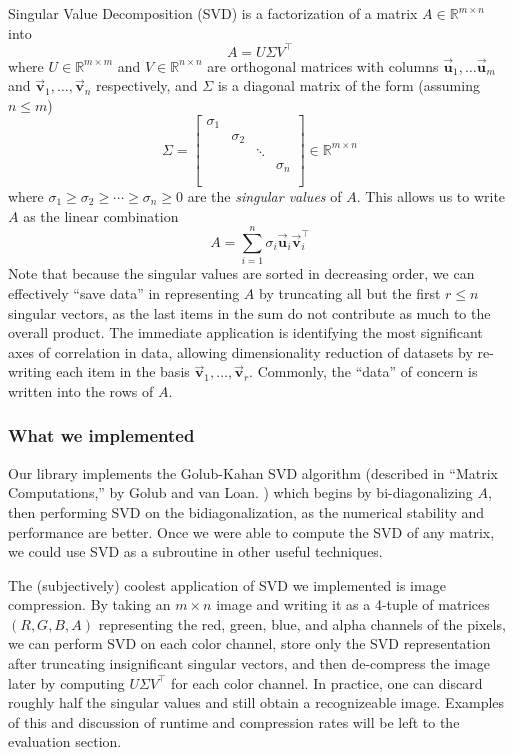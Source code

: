\documentclass[12pt, letterpaper]{article}
\theoremstyle{definition}
\theoremstyle{remark}
\newcommand{\vect}[1]{\vec{\mathbf{#1}}}
\newcommand{\R}{\mathbb{R}}
\begin{document}
Singular Value Decomposition (SVD) is a factorization of a matrix $A \in \R^{m \times n}$ into
\[
    A = U \Sigma V^\top
\]
where $U \in \R^{m \times m}$ and $V \in \R^{n \times n}$ are orthogonal matrices with 
columns $\vect u_1, \ldots \vect u_m$ and $\vect v_1, \ldots, \vect v_n$ respectively, and $\Sigma$
is a diagonal matrix of the form (assuming $n \leq m$)
\[
    \Sigma = \left[
        \begin{array}{cccc}
            \sigma_1 & & & \\
            & \sigma_2 & & \\
            & & \ddots & \\
            & & & \sigma_n \\
            & & & \\
            & & & 
        \end{array}
    \right] \in \R^{m \times n}
\]
where $\sigma_1 \geq \sigma_2 \geq \cdots \geq \sigma_n \geq 0$ are the \emph{singular values} of $A$.
This allows us to write $A$ as the linear combination
\[
    A = \sum_{i = 1}^n \sigma_i \vect{u}_i \vect{v}_i^\top
\]
Note that because the singular values are sorted in decreasing order, we can effectively ``save data'' in 
representing $A$ by truncating all but the first $r \leq n$ singular vectors, as the last items in the sum do not 
contribute as much to the 
overall product. The immediate application is identifying the most significant axes of correlation in data, allowing 
dimensionality reduction of datasets by re-writing each item in the basis $\vect{v}_1, \ldots, \vect{v}_r$.
Commonly, the ``data'' of concern is written into the rows of $A$.

\subsubsection{What we implemented}

Our library implements the Golub-Kahan SVD algorithm (described in ``Matrix Computations,'' by Golub and van Loan.
\textcolor{blue}{\autocite{golub13}}) which begins by bi-diagonalizing $A$, then performing SVD on the bidiagonalization,
as the numerical stability and performance are better. Once we were able to compute the SVD of any matrix, we could use 
SVD as a subroutine in other useful techniques.

The (subjectively) coolest application of SVD we implemented is image compression. By taking an $m \times n$ image and 
writing it as a 4-tuple of matrices $(R, G, B, A)$ representing the red, green, blue, and alpha channels of the pixels,
we can perform SVD on each color channel, store only the SVD representation after truncating insignificant singular
vectors, and then de-compress the image later by computing $U \Sigma V^\top$ for each color channel. In practice,
one can discard roughly half the singular values and still obtain a recognizeable image. Examples of this and discussion 
of runtime and compression rates will be left to the evaluation section.
\end{document}

